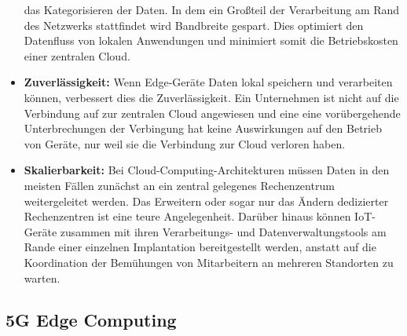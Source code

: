 \documentclass[runningheads]{llncs}
\numberwithin{figure}{section}
\begin{document}
\begin{itemize}
  das Kategorisieren der Daten. In dem ein Großteil der Verarbeitung am Rand des Netzwerks stattfindet wird Bandbreite gespart.
  Dies optimiert den Datenfluss von lokalen Anwendungen und minimiert somit die Betriebskosten einer zentralen Cloud.
  \item \textbf{Zuverlässigkeit:} Wenn Edge-Geräte Daten lokal speichern und verarbeiten können, verbessert dies die Zuverlässigkeit.
  Ein Unternehmen ist nicht auf die Verbindung auf zur zentralen Cloud angewiesen und eine eine vorübergehende Unterbrechungen der 
  Verbingung hat keine Auswirkungen auf den Betrieb von Geräte, nur weil sie die Verbindung zur Cloud verloren haben.
  \item \textbf{Skalierbarkeit:}
  Bei Cloud-Computing-Architekturen müssen Daten in den meisten Fällen zunächst an ein zentral gelegenes Rechenzentrum
  weitergeleitet werden. Das Erweitern oder sogar nur das Ändern dedizierter Rechenzentren ist eine teure Angelegenheit. 
  Darüber hinaus können IoT-Geräte zusammen mit ihren Verarbeitungs- und Datenverwaltungstools am Rande einer einzelnen 
  Implantation bereitgestellt werden, 
  anstatt auf die Koordination der Bemühungen von Mitarbeitern an mehreren Standorten zu warten.

\end{itemize}
\newpage

\subsection{5G Edge Computing}
\label{subsec:5G Edge Computing}
\end{document}
